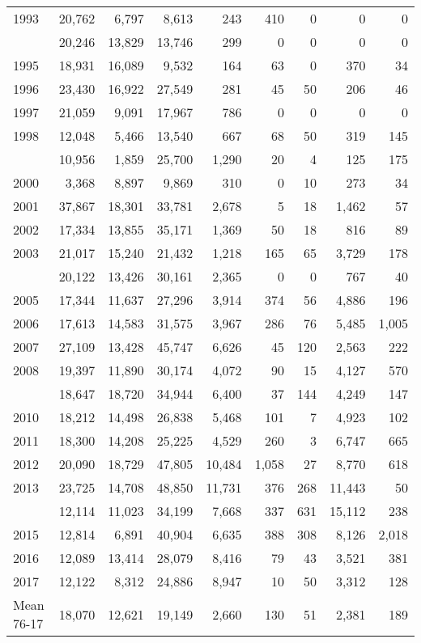 \documentclass[]{article}
\begin{document}
\begin{table}
\begin{tabular}[t]{lrrrrrrrr}
1993 & 20,762 & 6,797 & 8,613 & 243 & 410 & 0 & 0 & 0\\
\addlinespace
1994 & 20,246 & 13,829 & 13,746 & 299 & 0 & 0 & 0 & 0\\
1995 & 18,931 & 16,089 & 9,532 & 164 & 63 & 0 & 370 & 34\\
1996 & 23,430 & 16,922 & 27,549 & 281 & 45 & 50 & 206 & 46\\
1997 & 21,059 & 9,091 & 17,967 & 786 & 0 & 0 & 0 & 0\\
1998 & 12,048 & 5,466 & 13,540 & 667 & 68 & 50 & 319 & 145\\
\addlinespace
1999 & 10,956 & 1,859 & 25,700 & 1,290 & 20 & 4 & 125 & 175\\
2000 & 3,368 & 8,897 & 9,869 & 310 & 0 & 10 & 273 & 34\\
2001 & 37,867 & 18,301 & 33,781 & 2,678 & 5 & 18 & 1,462 & 57\\
2002 & 17,334 & 13,855 & 35,171 & 1,369 & 50 & 18 & 816 & 89\\
2003 & 21,017 & 15,240 & 21,432 & 1,218 & 165 & 65 & 3,729 & 178\\
\addlinespace
2004 & 20,122 & 13,426 & 30,161 & 2,365 & 0 & 0 & 767 & 40\\
2005 & 17,344 & 11,637 & 27,296 & 3,914 & 374 & 56 & 4,886 & 196\\
2006 & 17,613 & 14,583 & 31,575 & 3,967 & 286 & 76 & 5,485 & 1,005\\
2007 & 27,109 & 13,428 & 45,747 & 6,626 & 45 & 120 & 2,563 & 222\\
2008 & 19,397 & 11,890 & 30,174 & 4,072 & 90 & 15 & 4,127 & 570\\
\addlinespace
2009 & 18,647 & 18,720 & 34,944 & 6,400 & 37 & 144 & 4,249 & 147\\
2010 & 18,212 & 14,498 & 26,838 & 5,468 & 101 & 7 & 4,923 & 102\\
2011 & 18,300 & 14,208 & 25,225 & 4,529 & 260 & 3 & 6,747 & 665\\
2012 & 20,090 & 18,729 & 47,805 & 10,484 & 1,058 & 27 & 8,770 & 618\\
2013 & 23,725 & 14,708 & 48,850 & 11,731 & 376 & 268 & 11,443 & 50\\
\addlinespace
2014 & 12,114 & 11,023 & 34,199 & 7,668 & 337 & 631 & 15,112 & 238\\
2015 & 12,814 & 6,891 & 40,904 & 6,635 & 388 & 308 & 8,126 & 2,018\\
2016 & 12,089 & 13,414 & 28,079 & 8,416 & 79 & 43 & 3,521 & 381\\
2017 & 12,122 & 8,312 & 24,886 & 8,947 & 10 & 50 & 3,312 & 128\\
\rowcolor{yellow}%
Mean 76-17 & 18,070 & 12,621 & 19,149 & 2,660 & 130 & 51 & 2,381 & 189\\
\bottomrule
\end{tabular}
\end{table}
\end{document}
